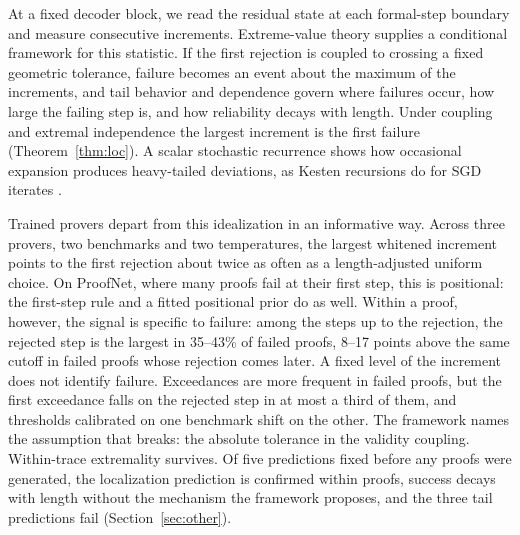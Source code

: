 \documentclass{article}
\newcommand{\1}{\mathbf{1}}
\begin{document}
At a fixed decoder block, we read the residual state at each formal-step boundary and measure consecutive increments. Extreme-value theory supplies a conditional framework for this statistic. If the first rejection is coupled to crossing a fixed geometric tolerance, failure becomes an event about the maximum of the increments, and tail behavior and dependence govern where failures occur, how large the failing step is, and how reliability decays with length. Under coupling and extremal independence the largest increment is the first failure (Theorem~\ref{thm:loc}). A scalar stochastic recurrence shows how occasional expansion produces heavy-tailed deviations, as Kesten recursions do for SGD iterates \citep{gurbuzbalaban2021}.

Trained provers depart from this idealization in an informative way. Across three provers, two benchmarks and two temperatures, the largest whitened increment points to the first rejection about twice as often as a length-adjusted uniform choice. On ProofNet, where many proofs fail at their first step, this is positional: the first-step rule and a fitted positional prior do as well. Within a proof, however, the signal is specific to failure: among the steps up to the rejection, the rejected step is the largest in 35--43\% of failed proofs, 8--17 points above the same cutoff in failed proofs whose rejection comes later. A fixed level of the increment does not identify failure. Exceedances are more frequent in failed proofs, but the first exceedance falls on the rejected step in at most a third of them, and thresholds calibrated on one benchmark shift on the other. The framework names the assumption that breaks: the absolute tolerance in the validity coupling. Within-trace extremality survives. Of five predictions fixed before any proofs were generated, the localization prediction is confirmed within proofs, success decays with length without the mechanism the framework proposes, and the three tail predictions fail (Section~\ref{sec:other}).
\end{document}

